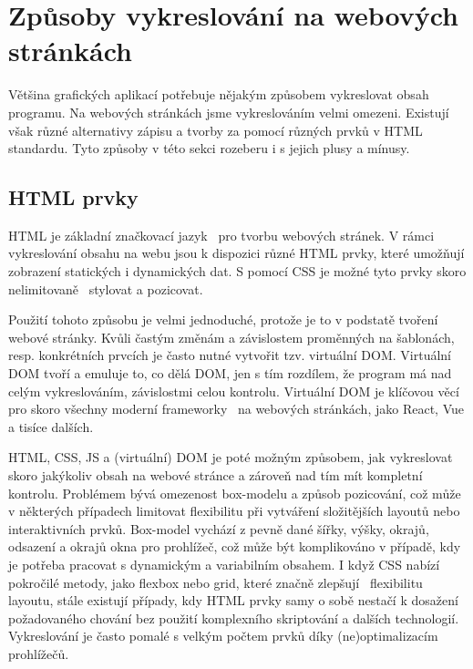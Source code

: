 \section{Způsoby vykreslování na webových stránkách}\label{text:vykreslovani}

Většina grafických aplikací potřebuje nějakým způsobem vykreslovat obsah programu.
Na webových stránkách jsme vykreslováním velmi omezeni.
Existují však různé alternativy zápisu a tvorby za pomocí různých prvků v HTML standardu.
Tyto způsoby v této sekci rozeberu i s jejich plusy a mínusy.

\subsection{HTML prvky}\label{text:vykreslovani/html}

HTML je základní značkovací jazyk~\cite{uzayr2022frontend} pro tvorbu webových stránek. 
V rámci vykreslování obsahu na webu jsou k dispozici různé HTML prvky, které umožňují zobrazení statických i dynamických dat.
S pomocí CSS je možné tyto prvky skoro nelimitovaně~\cite{uzayr2022frontend} stylovat a pozicovat.

Použití tohoto způsobu je velmi jednoduché, protože je to v podstatě tvoření webové stránky.
Kvůli častým změnám a závislostem proměnných na šablonách, resp. konkrétních prvcích je často nutné vytvořit tzv. virtuální DOM.
Virtuální DOM tvoří a emuluje to, co dělá DOM, jen s tím rozdílem, že program má nad celým vykreslováním, závislostmi celou kontrolu.
Virtuální DOM je klíčovou věcí pro skoro všechny moderní frameworky~\cite{uzayr2022frontend} na webových stránkách, jako React, Vue a tisíce dalších.

HTML, CSS, JS a (virtuální) DOM je poté možným způsobem, jak vykreslovat skoro jakýkoliv obsah na webové stránce a zároveň nad tím mít kompletní kontrolu.
Problémem bývá omezenost box-modelu a způsob pozicování, což může v některých případech limitovat flexibilitu při vytváření složitějších layoutů nebo interaktivních prvků. 
Box-model vychází z pevně dané šířky, výšky, okrajů, odsazení a okrajů okna pro prohlížeč, což může být komplikováno v případě, kdy je potřeba pracovat s dynamickým a variabilním obsahem. 
I když CSS nabízí pokročilé metody, jako flexbox nebo grid, které značně zlepšují~\cite{uzayr2022frontend} flexibilitu layoutu, stále existují případy, kdy HTML prvky samy o sobě nestačí k dosažení požadovaného chování bez použití komplexního skriptování a dalších technologií.
Vykreslování je často pomalé s velkým počtem prvků díky (ne)optimalizacím prohlížečů.

